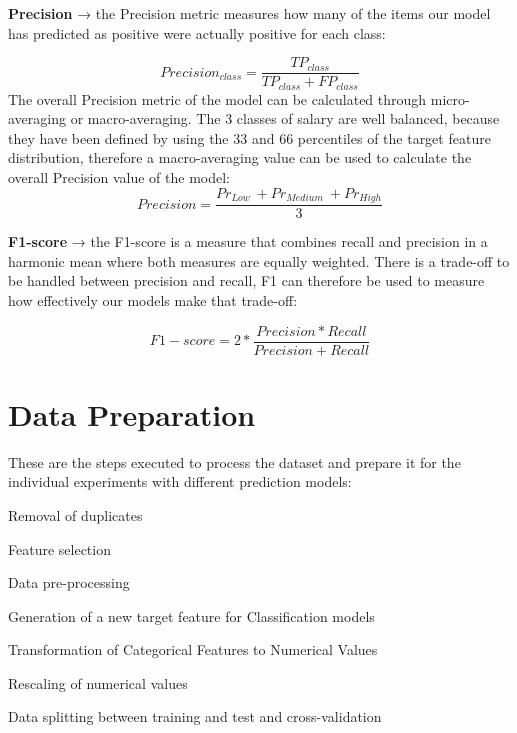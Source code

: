 \documentclass[11pt,a4paper]{article}
\newcommand{\SubItem}[1]{
  {\setlength\itemindent{13pt} \item[◦] #1}
}
\newcommand{\SubSubItem}[1]{
  {\setlength\itemindent{26pt} \item[◦] #1}
}
\begin{document}
\begin{itemize}
\SubItem{\textbf{Precision} → the Precision metric measures how many of the items our model has predicted as positive were actually positive for each class:}
\begin{displaymath}
Precision_{class} = \frac{TP_{class}}{TP_{class} + FP_{class}} 
\end{displaymath}
The overall Precision metric of the model can be calculated through micro-averaging or macro-averaging. The 3 classes of salary are well balanced, because they have been defined by using the 33 and 66 percentiles of the target feature distribution, therefore a macro-averaging value can be used to calculate the overall Precision value of the model:
\begin{displaymath}
Precision = \frac{Pr_{Low}\ + Pr_{Medium}\ + Pr_{High}}{3} 
\end{displaymath}
\SubItem{\textbf{F1-score} → the F1-score is a measure that combines recall and precision in a harmonic mean where both measures are equally weighted. There is a trade-off to be handled between precision and recall, F1 can therefore be used to measure how effectively our models make that trade-off:}
\begin{displaymath}
F1-score = 2 * \frac{Precision * Recall}{Precision + Recall} 
\end{displaymath}
\end{itemize}
\section{Data Preparation} 
These are the steps executed to process the dataset and prepare it for the individual experiments with different prediction models:
\begin{itemize}
\item Removal of duplicates
\item Feature selection
\item Data pre-processing
\SubItem{Generation of a new target feature for Classification models} 
\SubItem{Transformation of Categorical Features to Numerical Values}
\SubSubItem{Rescaling of numerical values}
\item Data splitting between training and test and cross-validation
\end{itemize}
\end{document}
